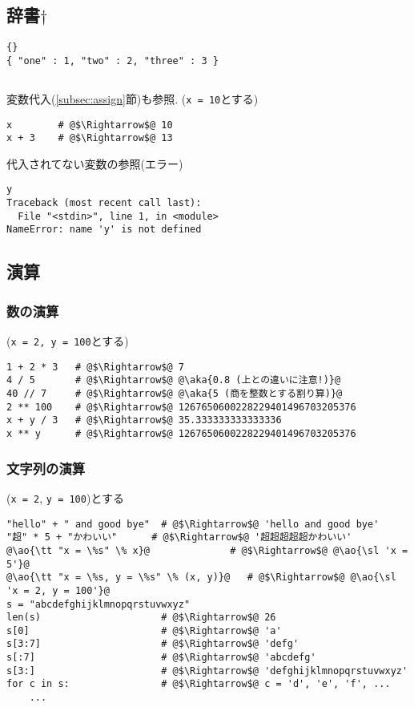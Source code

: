 \documentclass[landscape,7pt,dvipdfmx]{article}
\newcommand{\aka}[1]{{\color{red}{#1}}}
\newcommand{\ao}[1]{{\color{blue}{#1}}}
\begin{document}
\begin{multicols*}{3}
\subsection{辞書$\dagger$}
\begin{lstlisting}
{}
{ "one" : 1, "two" : 2, "three" : 3 }
\end{lstlisting}


\subsection{\ao{変数参照}}
変数代入(\ref{subsec:assign}節)も参照.
({\tt x = 10}とする)
\begin{lstlisting}
x        # @$\Rightarrow$@ 10
x + 3    # @$\Rightarrow$@ 13
\end{lstlisting}
代入されてない変数の参照(エラー)
\begin{lstlisting}
y
Traceback (most recent call last):
  File "<stdin>", line 1, in <module>
NameError: name 'y' is not defined
\end{lstlisting}

\subsection{演算}
\subsubsection{数の演算}
({\tt x = 2, y = 100}とする)
\begin{lstlisting}
1 + 2 * 3   # @$\Rightarrow$@ 7
4 / 5       # @$\Rightarrow$@ @\aka{0.8 (上との違いに注意!)}@
40 // 7     # @$\Rightarrow$@ @\aka{5 (商を整数とする割り算)}@
2 ** 100    # @$\Rightarrow$@ 1267650600228229401496703205376
x + y / 3   # @$\Rightarrow$@ 35.333333333333336
x ** y      # @$\Rightarrow$@ 1267650600228229401496703205376
\end{lstlisting}

\subsubsection{文字列の演算}
({\tt x = 2}, {\tt y = 100})とする
\begin{lstlisting}
"hello" + " and good bye"  # @$\Rightarrow$@ 'hello and good bye'
"超" * 5 + "かわいい"      # @$\Rightarrow$@ '超超超超超かわいい'
@\ao{\tt "x = \%s" \% x}@              # @$\Rightarrow$@ @\ao{\sl 'x = 5'}@
@\ao{\tt "x = \%s, y = \%s" \% (x, y)}@   # @$\Rightarrow$@ @\ao{\sl 'x = 2, y = 100'}@
s = "abcdefghijklmnopqrstuvwxyz"
len(s)                     # @$\Rightarrow$@ 26
s[0]                       # @$\Rightarrow$@ 'a'
s[3:7]                     # @$\Rightarrow$@ 'defg'
s[:7]                      # @$\Rightarrow$@ 'abcdefg'
s[3:]                      # @$\Rightarrow$@ 'defghijklmnopqrstuvwxyz'
for c in s:                # @$\Rightarrow$@ c = 'd', 'e', 'f', ...
    ...
\end{lstlisting}


\end{multicols*}
\end{document}

